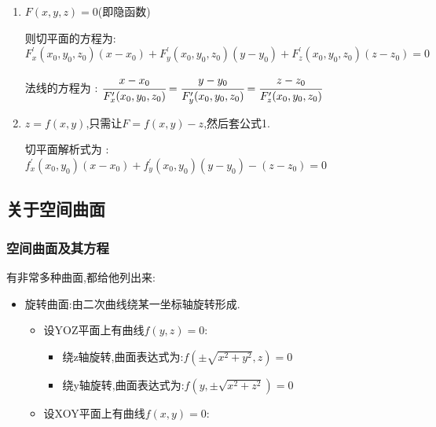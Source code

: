 \documentclass[UTF8,12pt]{ctexbook}
\newcommand{\derivative}{^\prime}
\newcommand{\defFunction}[1]{f(#1)}
\begin{document}
{{{{      \begin{enumerate}
        \item {
              $F(x,y,z) = 0$(即隐函数)

              则切平面的方程为:$F\derivative_x(x_0,y_0,z_0)(x - x_0) + F\derivative_y(x_0,y_0,z_0)(y - y_0) + F\derivative_z(x_0,y_0,z_0)(z - z_0) = 0$

              法线的方程为 : $\cfrac{x - x_0}{F\derivative_x(x_0,y_0,z_0)} = \cfrac{y - y_0}{F\derivative_y(x_0,y_0,z_0)} = \cfrac{z - z_0}{F\derivative_z(x_0,y_0,z_0)}$
              }
        \item {
              $z = \defFunction{x,y}$,只需让$F = \defFunction{x,y} - z$,然后套公式1.

              切平面解析式为 : $f\derivative_x(x_0,y_0)(x - x_0) + f\derivative_y(x_0,y_0)(y - y_0) - (z - z_0) = 0$
              }
      \end{enumerate}
    }%

  }%

  \subsection{关于空间曲面}{

    \subsubsection{空间曲面及其方程}{
      有非常多种曲面,都给他列出来:

      \begin{itemize}
        \item {
              旋转曲面:由二次曲线绕某一坐标轴旋转形成.

              \begin{itemize}
                \item {
                      设YOZ平面上有曲线$\defFunction{y,z} = 0$:

                      \begin{itemize}
                        \item 绕z轴旋转,曲面表达式为:$\defFunction{\pm\sqrt{x^2 + y^2},z} = 0$
                        \item 绕y轴旋转,曲面表达式为:$\defFunction{y,\pm\sqrt{x^2 + z^2}} = 0$
                      \end{itemize}
                      }
                \item {
                      设XOY平面上有曲线$\defFunction{x,y} = 0$:

}
\end{itemize}}
\end{itemize}}}}}
\end{document}
